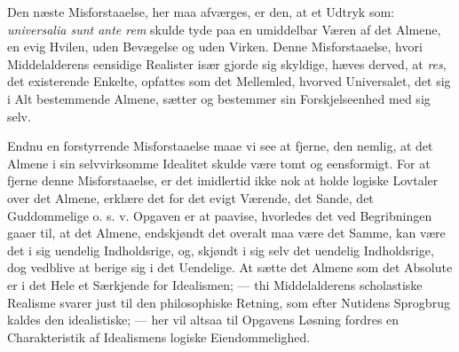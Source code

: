 \documentclass[11pt]{book}
\newcommand{\opage}[1]{\marginnote{\footnotesize\textit{[#1]}}}
\begin{document}
Den næste Misforstaaelse, her maa afværges, er den, at et Udtryk
som: \textit{universalia sunt ante rem} skulde tyde paa en
umiddelbar Væren af det Almene, en evig Hvilen, uden Bevægelse og
uden Virken. Denne Misforstaaelse, hvori Middelalderens eensidige
Realister især gjorde sig skyldige, hæves derved, at \textit{res},
det existerende Enkelte, opfattes som det Mellemled, hvorved
Universalet, det sig i Alt bestemmende Almene, sætter og bestemmer
sin Forskjelseenhed med sig selv.

Endnu en forstyrrende Misforstaaelse maae vi see at fjerne, den
nemlig, at det Almene i sin selvvirksomme Idealitet skulde være
tomt og eensformigt. For at fjerne denne Misforstaaelse, er det
imidlertid ikke nok at holde logiske Lovtaler over det Almene,
erklære det for det evigt Værende, det Sande, det Guddommelige
o. s. v. Opgaven er at paavise, hvorledes det ved Begribningen
gaaer til, at det Almene, endskjøndt det overalt maa være det
Samme, kan være det i sig uendelig Indholdsrige, og, skjøndt i sig
selv det uendelig Indholdsrige, dog vedblive at berige sig i det
Uendelige. At sætte det Almene som det Absolute er i det Hele et
Særkjende for Idealismen; --- thi Middelalderens scholastiske
Realisme svarer just til den philosophiske Retning, som efter
\opage{180} \setcounter{footnote}{0}%
Nutidens Sprogbrug kaldes den idealistiske; --- her vil altsaa til
Opgavens Løsning fordres en Charakteristik af Idealismens logiske
Eiendommelighed.
\end{document}
